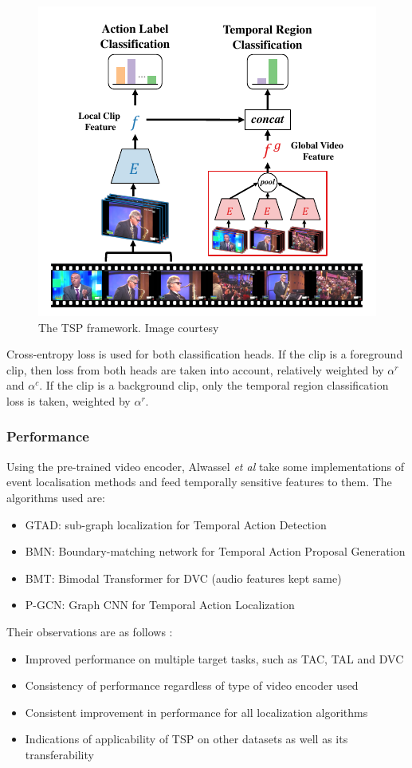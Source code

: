\begin{figure}
\centering
\includegraphics[width=0.5\linewidth]{assets/img/alwassel2021tsp.png}
\caption{The TSP framework. Image courtesy \cite{alwassel2021tsp}}
\label{fig:tsp}
\end{figure}

\par Cross-entropy loss is used for both classification heads. If the clip is a foreground 
clip, then loss from both heads are taken into account, relatively weighted by $\alpha^r$ 
and $\alpha^c$. If the clip is a background clip, only the temporal region classification 
loss is taken, weighted by $\alpha^r$.

\subsubsection{Performance}
Using the pre-trained video encoder, Alwassel \textit{et al} take some implementations of event localisation methods and feed temporally sensitive features to them. The algorithms used are:
\begin{itemize}
\item GTAD: sub-graph localization for Temporal Action Detection
\item BMN: Boundary-matching network for Temporal Action Proposal Generation
\item BMT: Bimodal Transformer for DVC \cite{iashin2020better} (audio features kept same)
\item P-GCN: Graph CNN for Temporal Action Localization
\end{itemize}

Their observations are as follows \cite{alwassel2021tsp}:
\begin{itemize}
\item Improved performance on multiple target tasks, such as TAC, TAL and DVC
\item Consistency of performance regardless of type of video encoder used
\item Consistent improvement in performance for all localization algorithms
\item Indications of applicability of TSP on other datasets as well as its transferability
\end{itemize}

